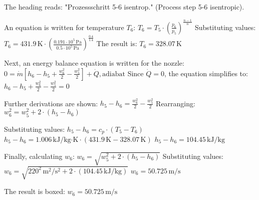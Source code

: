 The heading reads: "Prozessschritt 5-6 isentrop." (Process step 5-6 isentropic).  

An equation is written for temperature \( T_6 \):  
\( T_6 = T_5 \cdot \left( \frac{p_6}{p_5} \right)^{\frac{n-1}{n}} \)  
Substituting values:  
\( T_6 = 431.9 \, \text{K} \cdot \left( \frac{0.191 \cdot 10^5 \, \text{Pa}}{0.5 \cdot 10^5 \, \text{Pa}} \right)^{\frac{0.4}{1.4}} \)  
The result is:  
\( T_6 = 328.07 \, \text{K} \)  

Next, an energy balance equation is written for the nozzle:  
\( 0 = \dot{m} \left[ h_6 - h_5 + \frac{w_6^2}{2} - \frac{w_5^2}{2} \right] + \dot{Q}, \text{adiabat} \)  
Since \( \dot{Q} = 0 \), the equation simplifies to:  
\( h_6 - h_5 + \frac{w_6^2}{2} - \frac{w_5^2}{2} = 0 \)  

Further derivations are shown:  
\( h_5 - h_6 = \frac{w_6^2}{2} - \frac{w_5^2}{2} \)  
Rearranging:  
\( w_6^2 = w_5^2 + 2 \cdot (h_5 - h_6) \)  

Substituting values:  
\( h_5 - h_6 = c_p \cdot (T_5 - T_6) \)  
\( h_5 - h_6 = 1.006 \, \text{kJ/kg·K} \cdot (431.9 \, \text{K} - 328.07 \, \text{K}) \)  
\( h_5 - h_6 = 104.45 \, \text{kJ/kg} \)  

Finally, calculating \( w_6 \):  
\( w_6 = \sqrt{w_5^2 + 2 \cdot (h_5 - h_6)} \)  
Substituting values:  
\( w_6 = \sqrt{220^2 \, \text{m}^2/\text{s}^2 + 2 \cdot (104.45 \, \text{kJ/kg})} \)  
\( w_6 = 50.725 \, \text{m/s} \)  

The result is boxed:  
\( w_6 = 50.725 \, \text{m/s} \)